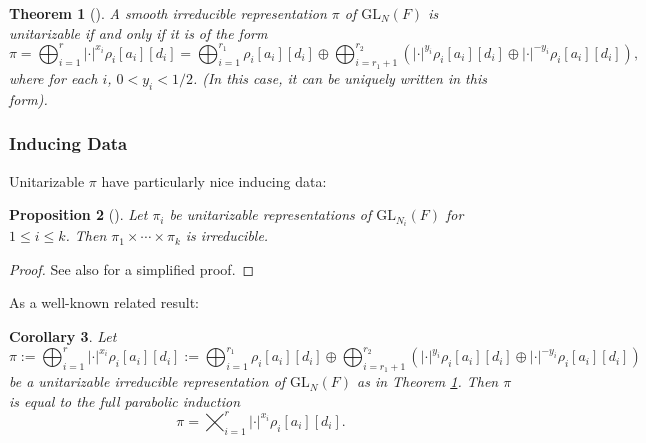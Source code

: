\documentclass{amsart}
\newcommand{\GL}{\mathrm{GL}}
\newcommand{\1}{\m 1}
\newtheorem{thm}{Theorem}[subsection]
\newtheorem{prop}[thm]{Proposition}
\newtheorem{cor}[thm]{Corollary}
\theoremstyle{remark}
\theoremstyle{definition}
\numberwithin{equation}{subsection}
\begin{document}
\begin{thm}[{\cite{Tad86b}}]\label{thm:unitarizable}
A smooth irreducible representation $\pi$ of $\GL_N(F)$ is unitarizable if and only if it is of the form
\[
\pi = \bigoplus_{i=1}^r |\cdot|^{x_i} \rho_i[a_i][d_i] = \bigoplus_{i=1}^{r_1}\rho_i[a_i][d_i] \oplus \bigoplus_{i=r_1+1}^{r_2} ( |\cdot|^{y_i} \rho_i[a_i][d_i] \oplus |\cdot|^{-y_i} \rho_i[a_i][d_i]),
\]
where for each $i$, $0 < y_i < 1/2$. (In this case, it can be uniquely written in this form). 
\end{thm}

\subsubsection{Inducing Data}
Unitarizable $\pi$ have particularly nice inducing data:
\begin{prop}[{\cite{ber06}}]\label{prop:unitaryinduction}
Let $\pi_i$ be unitarizable representations of $\GL_{N_i}(F)$ for $1 \leq i \leq k$. Then $\pi_1 \times \cdots \times \pi_k$ is irreducible. 
\end{prop}

\begin{proof}
See also \cite[\S6.3]{LM16} for a simplified proof. 
\end{proof}

As a well-known related result:

\begin{cor}\label{cor:unitarizableisfullinduction}
Let
\[
\pi := \bigoplus_{i=1}^r |\cdot|^{x_i} \rho_i[a_i][d_i] := \bigoplus_{i=1}^{r_1}\rho_i[a_i][d_i] \oplus \bigoplus_{i=r_1 + 1}^{r_2} ( |\cdot|^{y_i} \rho_i[a_i][d_i] \oplus |\cdot|^{-y_i} \rho_i[a_i][d_i])
\]
be a unitarizable irreducible representation of $\GL_N(F)$ as in Theorem \ref{thm:unitarizable}. Then $\pi$ is equal to the full parabolic induction
\[
\pi = \bigtimes_{i=1}^r |\cdot|^{x_i} \rho_i[a_i][d_i].
\]
\end{cor}
\end{document}
